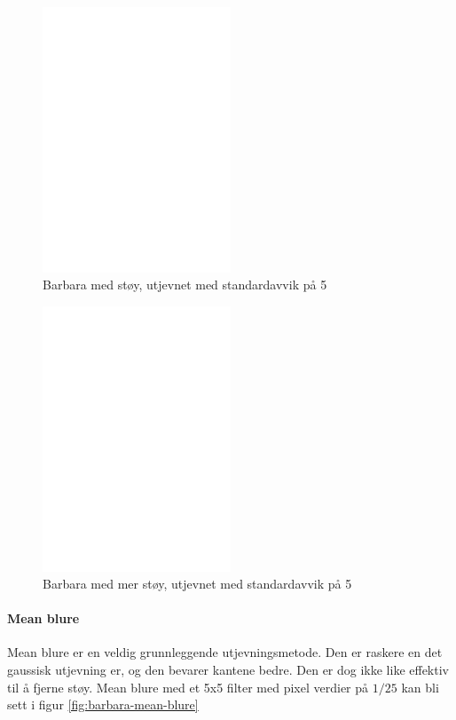 \documentclass[a4paper, 12pt]{article}
\begin{document}
\begin{figure}[h]
  \centering
  \includegraphics[width=0.5\textwidth]{images/gaussian-noise-1-5}
  \caption{Barbara med støy, utjevnet med standardavvik på 5}
  \label{fig:barbara-noise-1-5}
\end{figure}

\begin{figure}[h]
  \centering
  \includegraphics[width=0.5\textwidth]{images/barbara-noise-2-5}
  \caption{Barbara med mer støy, utjevnet med standardavvik på 5}
  \label{fig:barbara-noise-2-5}
\end{figure}

\paragraph{Mean blure}
Mean blure er en veldig grunnleggende utjevningsmetode. Den er raskere en det gaussisk utjevning er, og den bevarer kantene bedre. Den er dog ikke like effektiv til å fjerne støy.
Mean blure med et 5x5 filter med pixel verdier på $1/25$ kan bli sett i figur \ref{fig:barbara-mean-blure}
\end{document}
